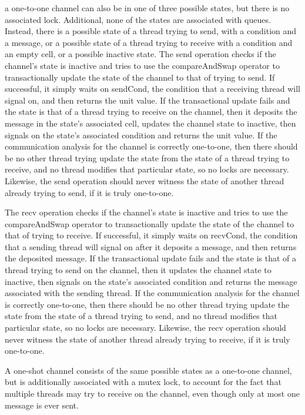 a one-to-one channel can also be in one of three possible states, but there is no associated
lock. Additional, none of the states are associated with queues.  Instead, there is a possible
state of a thread trying to send, with a condition and a message, or a possible state of a
thread trying to receive with a condition and an empty cell, or a possible inactive state.
The send operation checks if the channel's state is inactive and tries to use the
compareAndSwap operator to transactionally update the state of the channel to that of trying to
send.  If successful, it simply waits on sendCond, the condition that a receiving thread will
signal on, and then returns the unit value.  If the transactional update fails and the state is
that of a thread trying to receive on the channel, then it deposits the message in the state's
associated cell, updates the channel state to inactive, then signals on the state's associated
condition and returns the unit value.  If the communication analysis for the channel is
correctly one-to-one, then there should be no other thread trying update the state from the
state of a thread trying to receive, and no thread modifies that particular state, so no locks
are necessary.  Likewise, the send operation should never witness the state of another thread
already trying to send, if it is truly one-to-one.

The recv operation checks if the channel's state is inactive and tries to use the
compareAndSwap operator to transactionally update the state of the channel to that of trying
to receive.  If successful, it simply waits on recvCond, the condition that a sending thread
will signal on after it deposits a message, and then returns the deposited message.  If the
transactional update fails and the state is that of a thread trying to send on the channel,
then it updates the channel state to inactive, then signals on the state's associated
condition and returns the message associated with the sending thread.  If the communication
analysis for the channel is correctly one-to-one, then there should be no other thread trying
update the state from the state of a thread trying to send, and no thread modifies that
particular state, so no locks are necessary.  Likewise, the recv operation should never
witness the state of another thread already trying to receive, if it is truly one-to-one.


A one-shot channel consists of the same possible states as a one-to-one channel, but is
additionally associated with a mutex lock, to account for the fact that multiple threads may
try to receive on the channel, even though only at most one message is ever sent.

